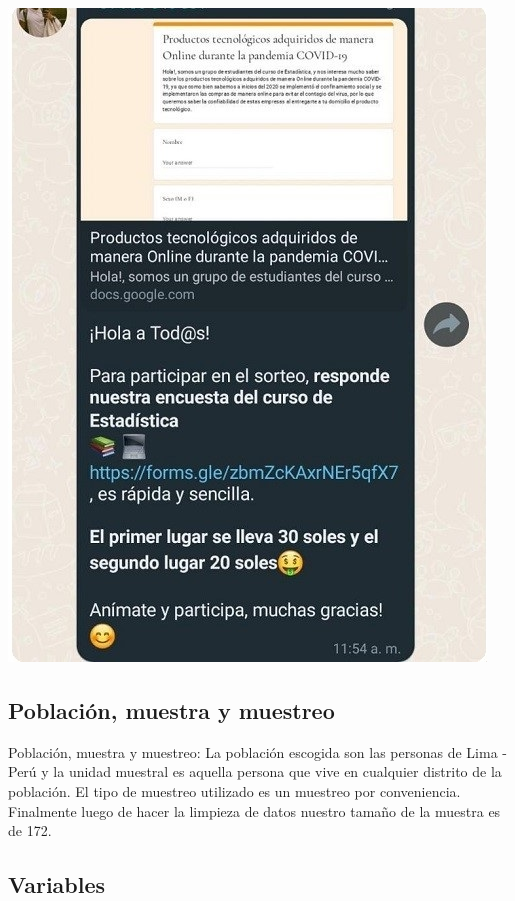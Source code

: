 \documentclass[
]{article}
\begin{document}
\includegraphics{encuesta.jpg}

\hypertarget{poblaciuxf3n-muestra-y-muestreo}{%
\subsection{\texorpdfstring{\textbf{Población, muestra y
muestreo}}{Población, muestra y muestreo}}\label{poblaciuxf3n-muestra-y-muestreo}}

Población, muestra y muestreo: La población escogida son las personas de
Lima - Perú y la unidad muestral es aquella persona que vive en
cualquier distrito de la población. El tipo de muestreo utilizado es un
muestreo por conveniencia. Finalmente luego de hacer la limpieza de
datos nuestro tamaño de la muestra es de 172.

\hypertarget{variables}{%
\subsection{\texorpdfstring{\textbf{Variables}}{Variables}}\label{variables}}
\end{document}
